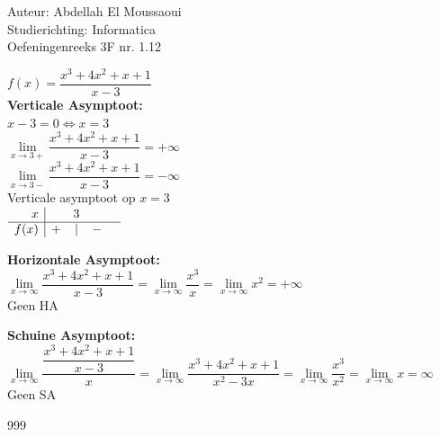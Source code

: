 \documentclass[a4paper]{article}
\begin{document}
  
\noindent \large Auteur: Abdellah El Moussaoui \\
\noindent \large Studierichting: Informatica\\
\noindent \large Oefeningenreeks 3F nr. 1.12\\

\medskip

\normalsize

$f(x) = \dfrac{x^3+4x^2+x+1}{x-3}$\\

\textbf{Verticale Asymptoot:}\\

$x-3 = 0 \Leftrightarrow x = 3$\\

$\lim\limits_{x \rightarrow 3+} \dfrac{x^3+4x^2+x+1}{x-3} = +\infty$\\

$\lim\limits_{x \rightarrow 3-} \dfrac{x^3+4x^2+x+1}{x-3} = -\infty$\\

Verticale asymptoot op $x = 3$\\

$\begin{array}{r|c c c c}
x & & 3 & &\\ 
\hline f(x) & + & | & - &
\end{array}$ \\

\medskip

\textbf{Horizontale Asymptoot:}\\

$\lim\limits_{x \rightarrow \infty} \dfrac{x^3+4x^2+x+1}{x-3} = \lim\limits_{x \rightarrow \infty} \dfrac{x^3}{x} = \lim\limits_{x \rightarrow \infty} x^2 = +\infty$\\

Geen HA\\

\medskip

\textbf{Schuine Asymptoot:}\\

$\lim\limits_{x \rightarrow \infty} \dfrac{\dfrac{x^3+4x^2+x+1}{x-3}}{x} = \lim\limits_{x \rightarrow \infty} \dfrac{x^3+4x^2+x+1}{x^2-3x} = \lim\limits_{x \rightarrow \infty} \dfrac{x^3}{x^2} = \lim\limits_{x \rightarrow \infty}  x = \infty$\\

Geen SA\\

\begin{thebibliography}{999}
\end{thebibliography}
\end{document}

